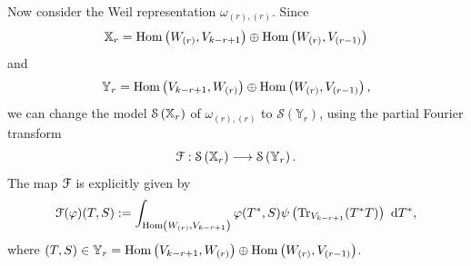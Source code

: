 \documentclass[11pt,reqno]{amsart}
\renewcommand{\1}{{\mathbf{1}}} \newcommand{\sB}{{\mathscr{B}}}
\newcommand{\BY}{{\mathbb {Y}}} \newcommand{\BZ}{{\mathbb {Z}}}
\newcommand{\CS}{{\mathcal {S}}} \newcommand{\CT}{{\mathcal {T}}}
\newcommand{\Tr}{{\mathrm{Tr}}}
\newcommand{\lra}{\longrightarrow}\newcommand{\lla}{\longleftarrow}
\theoremstyle{plain}
\theoremstyle{definition}
\numberwithin{equation}{section}
\begin{document}
Now consider the Weil representation $\omega_{(r),(r)}$. Since
$${\mathbb {X}}_{r}={\mathrm{Hom}}\left(W_{(r)},V_{k-r+1}\right)\oplus{\mathrm{Hom}}\left(W_{(r)},V_{(r-1)}\right)$$ and 
$$\BY_{r}=\Hom\left(V_{k-r+1},W_{(r)}\right)\oplus\Hom\left(W_{(r)},V_{(r-1)}\right),
$$  we can change the model $\CS\left(\BX_r\right)$ of $\omega_{(r),(r)}$ to 
$\CS\left(\BY_r\right)$, using the partial Fourier transform
$$\CF:\CS\left(\BX_r\right)\lra \CS\left(\BY_r\right).$$
The map ${\mathcal {F}}$ is explicitly given by
\begin{equation}\label{equ fourier}
\CF(\varphi)(T,S):=\int_{\Hom\left(W_{(r)},V_{k-r+1}\right)}\varphi(T^*,S)\psi\left(\Tr_{V_{k-r+1}}(T^*T)\right)\ \d T^*,\end{equation} where $(T,S)\in\BY_r=\Hom\left(V_{k-r+1},W_{(r)}\right)\oplus\Hom\left(W_{(r)},V_{(r-1)}\right)$.

\end{document}
